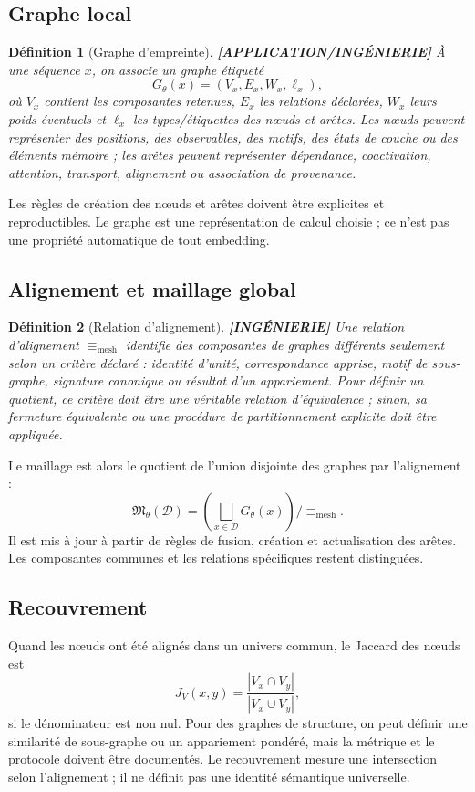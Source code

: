 \documentclass[11pt,a4paper]{article}
\newtheorem{definition}{Définition}[section]
\theoremstyle{remark}
\newcommand{\D}{\mathcal D}
\newcommand{\Mesh}{\mathfrak M}
\begin{document}
\subsection{Graphe local}
\begin{definition}[Graphe d'empreinte] \textbf{[APPLICATION/INGÉNIERIE]}
À une séquence $x$, on associe un graphe étiqueté
\[
G_\theta(x)=(V_x,E_x,W_x,\ell_x),
\]
où $V_x$ contient les composantes retenues, $E_x$ les relations déclarées, $W_x$ leurs poids éventuels et $\ell_x$ les types/étiquettes des nœuds et arêtes. Les nœuds peuvent représenter des positions, des observables, des motifs, des états de couche ou des éléments mémoire ; les arêtes peuvent représenter dépendance, coactivation, attention, transport, alignement ou association de provenance.
\end{definition}

Les règles de création des nœuds et arêtes doivent être explicites et reproductibles. Le graphe est une représentation de calcul choisie ; ce n'est pas une propriété automatique de tout embedding.

\subsection{Alignement et maillage global}
\begin{definition}[Relation d'alignement] \textbf{[INGÉNIERIE]}
Une relation d'alignement $\equiv_{\mathrm{mesh}}$ identifie des composantes de graphes différents seulement selon un critère déclaré : identité d'unité, correspondance apprise, motif de sous-graphe, signature canonique ou résultat d'un appariement. Pour définir un quotient, ce critère doit être une véritable relation d'équivalence ; sinon, sa fermeture équivalente ou une procédure de partitionnement explicite doit être appliquée.
\end{definition}

Le maillage est alors le quotient de l'union disjointe des graphes par l'alignement :
\[
\boxed{\Mesh_\theta(\D)=\left(\bigsqcup_{x\in\D}G_\theta(x)\right)/\!\equiv_{\mathrm{mesh}}.}
\]
Il est mis à jour à partir de règles de fusion, création et actualisation des arêtes. Les composantes communes et les relations spécifiques restent distinguées.

\subsection{Recouvrement}
Quand les nœuds ont été alignés dans un univers commun, le Jaccard des nœuds est
\[
J_V(x,y)=\frac{|V_x\cap V_y|}{|V_x\cup V_y|},
\]
si le dénominateur est non nul. Pour des graphes de structure, on peut définir une similarité de sous-graphe ou un appariement pondéré, mais la métrique et le protocole doivent être documentés. Le recouvrement mesure une intersection selon l'alignement ; il ne définit pas une identité sémantique universelle.
\end{document}
